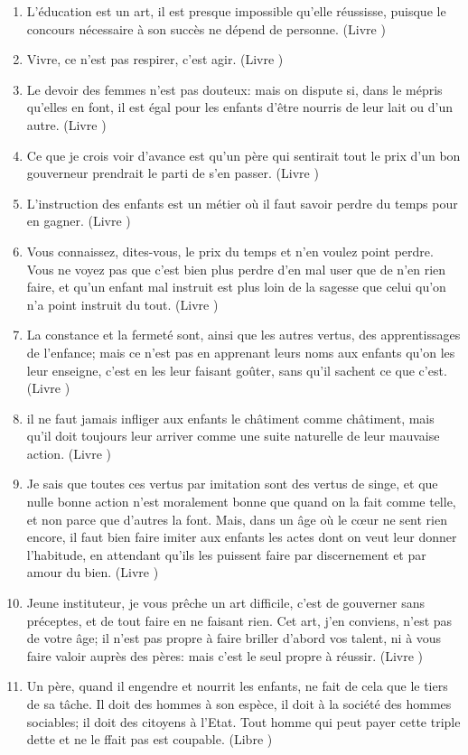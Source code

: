 \documentclass[a4paper, 11pt, hidelinks]{article}
\newcommand{\rb}[1]{\Romanbar{#1}}
\begin{document}
\begin{enumerate}
    \item L'éducation est un art, il est presque impossible qu'elle réussisse, puisque le concours nécessaire à son succès ne dépend de personne. (Livre \rb{1})
    \item Vivre, ce n'est pas respirer, c'est agir. (Livre \rb{1})
    \item Le devoir des femmes n'est pas douteux: mais on dispute si, dans le mépris qu'elles en font, il est égal pour les enfants d'être nourris de leur lait ou d'un autre. (Livre \rb{1})
    \item Ce que je crois voir d'avance est qu'un père qui sentirait tout le prix d'un bon gouverneur prendrait le parti de s'en passer. (Livre \rb{1})
    \item L'instruction des enfants est un métier où il faut savoir perdre du temps pour en gagner. (Livre \rb{2})
    \item Vous connaissez, dites-vous, le prix du temps et n'en voulez point perdre. Vous ne voyez pas que c'est bien plus perdre d'en mal user que de n'en rien faire, et qu'un enfant mal instruit est plus loin de la sagesse que celui qu'on n'a point instruit du tout. (Livre \rb{2})
    \item La constance et la fermeté sont, ainsi que les autres vertus, des apprentissages de l'enfance; mais ce n'est pas en apprenant leurs noms aux enfants qu'on les leur enseigne, c'est en les leur faisant goûter, sans qu'il sachent ce que c'est. (Livre \rb{2})
    \item il ne faut jamais infliger aux enfants le châtiment comme châtiment, mais qu'il doit toujours leur arriver comme une suite naturelle de leur mauvaise action. (Livre \rb{2})
    \item Je sais que toutes ces vertus par imitation sont des vertus de singe, et que nulle bonne action n'est moralement bonne que quand on la fait comme telle, et non parce que d'autres la font. Mais, dans un âge où le c\oe ur ne sent rien encore, il faut bien faire imiter aux enfants les actes dont on veut leur donner l'habitude, en attendant qu'ils les puissent faire par discernement et par amour du bien. (Livre \rb{2})
    \item Jeune instituteur, je vous prêche un art difficile, c'est de gouverner sans préceptes, et de tout faire en ne faisant rien. Cet art, j'en conviens, n'est pas de votre âge; il n'est pas propre à faire briller d'abord vos talent, ni à vous faire valoir auprès des pères: mais c'est le seul propre à réussir. (Livre \rb{2}) 
    \item Un père, quand il engendre et nourrit les enfants, ne fait de cela que le tiers de sa tâche. Il doit des hommes à son espèce, il doit à la société des hommes sociables; il doit des citoyens à l'Etat. Tout homme qui peut payer cette triple dette et ne le ffait pas est coupable. (Libre \rb{1})
\end{enumerate}
\end{document}
